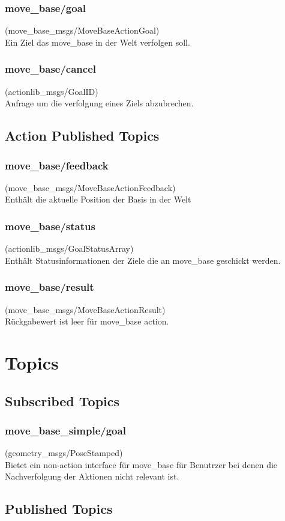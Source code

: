 \documentclass[oribibl]{llncs}
\begin{document}
\subsubsection{move\_base/goal} (move\_base\_msgs/MoveBaseActionGoal)\\
	Ein Ziel das move\_base in der Welt verfolgen soll.
\subsubsection{move\_base/cancel} (actionlib\_msgs/GoalID)\\
	Anfrage um die verfolgung eines Ziels abzubrechen.
\subsection{Action Published Topics}
\subsubsection{move\_base/feedback} (move\_base\_msgs/MoveBaseActionFeedback)\\
	Enthält die aktuelle Position der Basis in der Welt
\subsubsection{move\_base/status} (actionlib\_msgs/GoalStatusArray)\\
	Enthält Statusinformationen der Ziele die an move\_base geschickt werden.
\subsubsection{move\_base/result} (move\_base\_msgs/MoveBaseActionResult)\\
	Rückgabewert ist leer für move\_base action.
\section{Topics}
\subsection{Subscribed Topics}
\subsubsection{move\_base\_simple/goal} (geometry\_msgs/PoseStamped)\\
	Bietet ein non-action interface für move\_base für Benutrzer bei denen die Nachverfolgung der Aktionen nicht relevant ist.
\subsection{Published Topics}
\end{document}
